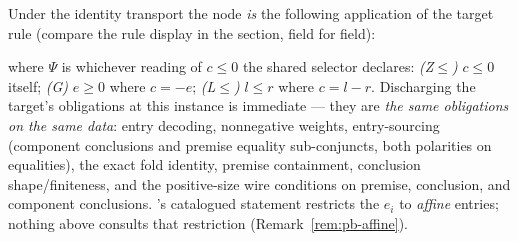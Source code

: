 \begin{brecipe}\label{rec:pb-filled}
Under the identity transport the  node \emph{is} the
following application of the target rule (compare the rule display in
the  section, field for field):
\begin{mathpar}
\end{mathpar}
where $\Psi$ is whichever reading of $c \leq 0$ the shared selector
declares: \emph{(Z$\leq$)} $c \leq 0$ itself; \emph{(G)} $e \geq 0$
where $c = -e$; \emph{(L$\leq$)} $l \leq r$ where $c = l - r$.
Discharging the target's obligations at this instance is immediate ---
they are \emph{the same obligations on the same data}: entry decoding,
nonnegative weights, entry-sourcing (component conclusions and premise
equality sub-conjuncts, both polarities on equalities), the exact fold
identity, premise containment, conclusion shape/finiteness, and the
positive-size wire conditions on premise, conclusion, and component
conclusions. 's catalogued statement restricts the
$e_i$ to \emph{affine} entries; nothing above consults that restriction
(Remark~\ref{rem:pb-affine}).
\end{brecipe}

